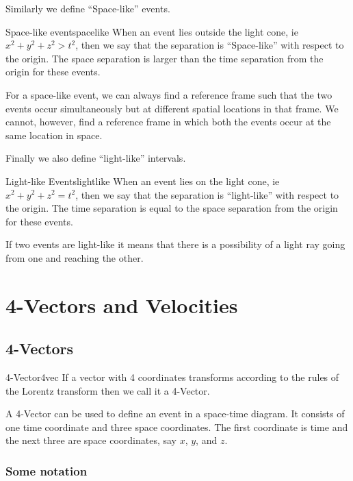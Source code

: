 \documentclass[16pt]{scrartcl}
\numberwithin{equation}{section}
\theoremstyle{plain}
\theoremstyle{definition}
\begin{document}
Similarly we define ``Space-like'' events.

\begin{defn}{Space-like event}{spacelike}
    When an event lies outside the light cone, ie $x^2+y^2+z^2 > t^2$, then we say that the separation is ``Space-like'' with respect to the origin. The space separation is larger than the time separation from the origin for these events.
\end{defn}

For a space-like event, we can always find a reference frame such that the two events occur simultaneously but at different spatial locations in that frame. We cannot, however, find a reference frame in which both the events occur at the same location in space.

Finally we also define ``light-like'' intervals.

\begin{defn}{Light-like Events}{lightlike}
    When an event lies on the light cone, ie $x^2+y^2+z^2 = t^2$, then we say that the separation is ``light-like'' with respect to the origin. The time separation is equal to the space separation from the origin for these events.
\end{defn}

If two events are light-like it means that there is a possibility of a light ray going from one and reaching the other.

\section{4-Vectors and Velocities}

\subsection{4-Vectors}

\begin{defn}{4-Vector}{4vec}
    If a vector with 4 coordinates transforms according to the rules of the Lorentz transform then we call it a 4-Vector.
\end{defn}

A 4-Vector can be used to define an event in a space-time diagram. It consists of one time coordinate and three space coordinates. The first coordinate is time and the next three are space coordinates, say $x$, $y$, and $z$.

\subsubsection*{Some notation}
\end{document}
